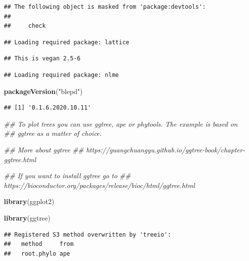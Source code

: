 \documentclass[]{article}
\newenvironment{Shaded}{\begin{snugshade}}{\end{snugshade}}
\newcommand{\CommentTok}[1]{\textcolor[rgb]{0.56,0.35,0.01}{\textit{#1}}}
\newcommand{\KeywordTok}[1]{\textcolor[rgb]{0.13,0.29,0.53}{\textbf{#1}}}
\newcommand{\NormalTok}[1]{#1}
\newcommand{\StringTok}[1]{\textcolor[rgb]{0.31,0.60,0.02}{#1}}
\begin{document}
\begin{verbatim}
## The following object is masked from 'package:devtools':
## 
##     check
\end{verbatim}

\begin{verbatim}
## Loading required package: lattice
\end{verbatim}

\begin{verbatim}
## This is vegan 2.5-6
\end{verbatim}

\begin{verbatim}
## Loading required package: nlme
\end{verbatim}

\begin{Shaded}
\begin{Highlighting}[]
\KeywordTok{packageVersion}\NormalTok{(}\StringTok{"blepd"}\NormalTok{)}
\end{Highlighting}
\end{Shaded}

\begin{verbatim}
## [1] '0.1.6.2020.10.11'
\end{verbatim}

\begin{Shaded}
\begin{Highlighting}[]
\CommentTok{## To plot trees you can use ggtree, ape or phytools. The example is based on}
\CommentTok{## ggtree as a matter of choice.}

\CommentTok{## More about ggtree}
\CommentTok{## https://guangchuangyu.github.io/ggtree-book/chapter-ggtree.html}

\CommentTok{## If you want to install ggtree go to}
\CommentTok{## https://bioconductor.org/packages/release/bioc/html/ggtree.html}

\KeywordTok{library}\NormalTok{(ggplot2)}

\KeywordTok{library}\NormalTok{(ggtree)}
\end{Highlighting}
\end{Shaded}

\begin{verbatim}
## Registered S3 method overwritten by 'treeio':
##   method     from
##   root.phylo ape
\end{verbatim}
\end{document}
